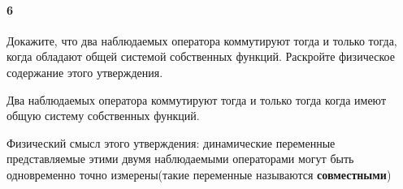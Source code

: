



\paragraph{6}
Докажите, что два наблюдаемых оператора коммутируют тогда и только тогда, когда обладают общей системой собственных функций. Раскройте физическое содержание этого утверждения.

\begin{theorem}
	Два наблюдаемых оператора коммутируют тогда и только тогда когда имеют общую систему собственных функций.
\end{theorem}
Физический смысл этого утверждения: динамические переменные представляемые этими двумя наблюдаемыми операторами могут быть одновременно точно измерены(такие переменные называются \textbf{совместными})\\

